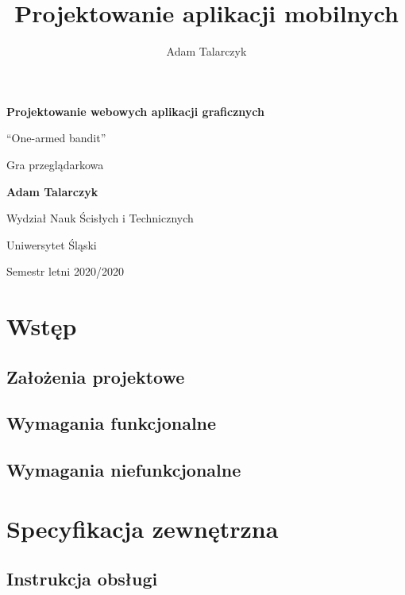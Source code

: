 \documentclass[a4paper,11pt,titlepage]{article}
\author{Adam Talarczyk}
\title{Projektowanie aplikacji mobilnych}
\begin{document}
\begin{titlepage}
    \begin{center}
        \vspace*{1cm}
 
        \Huge
        \textbf{Projektowanie webowych aplikacji graficznych}
 
        \vspace{0.5cm}
        \LARGE
        ``One-armed bandit''


Gra przeglądarkowa
 
        \vspace{1.5cm}
 
        \textbf{Adam Talarczyk}
 
        \vfill
 
        \vspace{0.8cm}
 
        \Large
        Wydział Nauk Ścisłych i Technicznych

        Uniwersytet Śląski

	Semestr letni 2020/2020
 
    \end{center}
\end{titlepage}
\newpage
\tableofcontents
\newpage

\section{Wstęp}
\subsection{Założenia projektowe}

\subsection{Wymagania funkcjonalne}

\subsection{Wymagania niefunkcjonalne}


\section{Specyfikacja zewnętrzna}
\subsection{Instrukcja obsługi}
\end{document}

